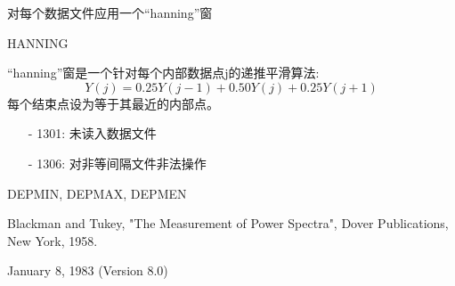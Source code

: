 \label{cmd:hanning}

对每个数据文件应用一个``hanning''窗

HANNING

``hanning''窗是一个针对每个内部数据点j的递推平滑算法:
	\[ Y(j)=0.25Y(j-1)+0.50Y(j)+0.25Y(j+1)\]
每个结束点设为等于其最近的内部点。

\begin{itemize}
\item[-]1301: 未读入数据文件
\item[-]1306: 对非等间隔文件非法操作
\end{itemize}

DEPMIN, DEPMAX, DEPMEN

Blackman and Tukey, "The Measurement of Power Spectra", Dover Publications, New York, 1958.

January 8, 1983 (Version 8.0)
